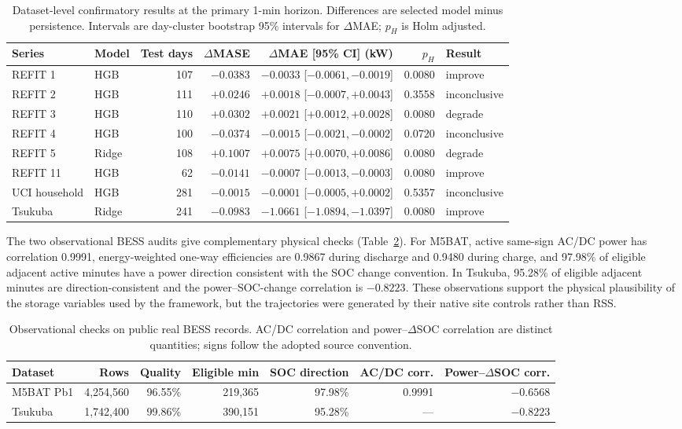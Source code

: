 \begin{table}[!t]
\caption{Dataset-level confirmatory results at the primary 1-min horizon.
Differences are selected model minus persistence. Intervals are day-cluster
bootstrap 95\% intervals for $\Delta$MAE; $p_H$ is Holm adjusted.}
\label{tab:real-forecast-detail}
\centering
\scriptsize
\setlength{\tabcolsep}{2.8pt}
\begin{tabular}{@{}llrrrrl@{}}
\toprule
Series & Model & Test days & $\Delta$MASE & $\Delta$MAE [95\% CI] (kW) & $p_H$ & Result \\
\midrule
REFIT 1 & HGB & 107 & $-0.0383$ & $-0.0033$ [$-0.0061,-0.0019$] & 0.0080 & improve \\
REFIT 2 & HGB & 111 & $+0.0246$ & $+0.0018$ [$-0.0007,+0.0043$] & 0.3558 & inconclusive \\
REFIT 3 & HGB & 110 & $+0.0302$ & $+0.0021$ [$+0.0012,+0.0028$] & 0.0080 & degrade \\
REFIT 4 & HGB & 100 & $-0.0374$ & $-0.0015$ [$-0.0021,-0.0002$] & 0.0720 & inconclusive \\
REFIT 5 & Ridge & 108 & $+0.1007$ & $+0.0075$ [$+0.0070,+0.0086$] & 0.0080 & degrade \\
REFIT 11 & HGB & 62 & $-0.0141$ & $-0.0007$ [$-0.0013,-0.0003$] & 0.0080 & improve \\
UCI household & HGB & 281 & $-0.0015$ & $-0.0001$ [$-0.0005,+0.0002$] & 0.5357 & inconclusive \\
Tsukuba & Ridge & 241 & $-0.0983$ & $-1.0661$ [$-1.0894,-1.0397$] & 0.0080 & improve \\
\bottomrule
\end{tabular}
\end{table}

The two observational BESS audits give complementary physical checks
(Table~\ref{tab:real-bess}). For M5BAT, active same-sign AC/DC power has
correlation 0.9991, energy-weighted one-way efficiencies are 0.9867 during
discharge and 0.9480 during charge, and 97.98\% of eligible adjacent active
minutes have a power direction consistent with the SOC change convention. In
Tsukuba, 95.28\% of eligible adjacent minutes are direction-consistent and the
power--SOC-change correlation is $-0.8223$. These observations support the
physical plausibility of the storage variables used by the framework, but the
trajectories were generated by their native site controls rather than RSS.

\begin{table}[!t]
\caption{Observational checks on public real BESS records. AC/DC correlation
and power--$\Delta$SOC correlation are distinct quantities; signs follow the
adopted source convention.}
\label{tab:real-bess}
\centering
\footnotesize
\begin{tabular}{@{}lrrrrrr@{}}
\toprule
Dataset & Rows & Quality & Eligible min & SOC direction & AC/DC corr. & Power--$\Delta$SOC corr. \\
\midrule
M5BAT Pb1 & 4,254,560 & 96.55\% & 219,365 & 97.98\% & 0.9991 & $-0.6568$ \\
Tsukuba & 1,742,400 & 99.86\% & 390,151 & 95.28\% & --- & $-0.8223$ \\
\bottomrule
\end{tabular}
\end{table}

